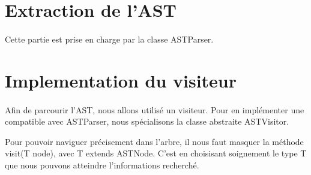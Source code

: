 \documentclass[a4paper]{article}
\begin{document}
    \newpage
    \begin{multicols}{2}
        [
        ]
        \section{Extraction de l'AST}
        \paragraph{} Cette partie est prise en charge par la classe ASTParser.
        \section{Implementation du visiteur}
        \paragraph{} Afin de parcourir l'AST, nous allons utilisé un visiteur. Pour en implémenter une compatible avec ASTParser, nous spécialisons la classe abstraite ASTVisitor.

        Pour pouvoir naviguer précisement dans l'arbre, il nous faut masquer la méthode visit(T node), avec T extends ASTNode. C'est en choisisant soignement le type T que nous pouvons atteindre l'informations recherché.


\end{multicols}
\end{document}

